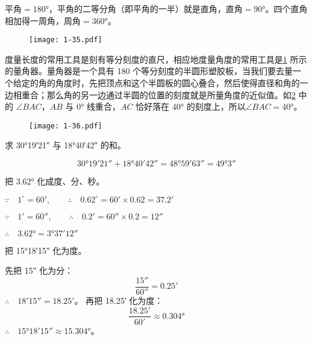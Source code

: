 平角$=\ang{180}$，平角的二等分角（即平角的一半）就是直角，直角$=\ang{90}$。四个直角相加得一周角，周角$=\ang{360}$。

\begin{figure}
  \texttt{[image: 1-35.pdf]}
	\caption{}\label{fig:1-35}
\end{figure}

度量长度的常用工具是刻有等分刻度的直尺，相应地度量角度的常用工具是\cref{fig:1-35} 所示的量角器。量角器是一个具有 180 个等分刻度的半圆形塑胶板，当我们要去量一个给定的角的角度时，先把顶点和这个半圆板的圆心叠合，然后使得直径和角的一边相重合；那么角的另一边通过半圆的位置的刻度就是所量角度的近似值。如\cref{fig:1-36} 中的 $\angle BAC$，$AB$ 与 \ang{0} 线重合，$AC$ 恰好落在 \ang{40} 的刻度上，所以$\angle BAC=\ang{40}$。

\begin{figure}
	\texttt{[image: 1-36.pdf]}
	\caption{}\label{fig:1-36}
\end{figure}

\begin{example}
	求 \ang{30;19;21} 与 \ang{18;40;42} 的和。
\end{example}

\begin{solution}
\[ \ang{30;19;21}+\ang{18;40;42}=\ang{48;59;63} =\ang{49;;3}\]
\end{solution}

\begin{example}
	把 \ang{3.62} 化成度、分、秒。
\end{example}

\begin{solution}
$\because\quad 1^{\circ}=60',\qquad \therefore\quad 0.62^{\circ}=60'\times 0.62=37.2'$

$\because\quad 1'=60'',\qquad \therefore\quad 0.2'=60''\times 0.2=12''$

$\therefore\quad \ang{3.62}=\ang{3;37;12}$
\end{solution}

\begin{example}
	把 \ang{15;18;15} 化为度。
\end{example}


\begin{solution}
	先把 \ang{;;15} 化为分：
\[\frac{\ang{;;15}}{\ang{;;60}}=\ang{;0.25;}\]
$\therefore\quad \ang{;18;15}=\ang{;18.25;}$。
再把 \ang{;18.25;} 化为度：
\[\frac{\ang{;18.25;}}{\ang{;60;}}\approx \ang{0.304}\]
$\therefore\quad \ang{15;18;15}\approx \ang{15.304}$。
\end{solution}

